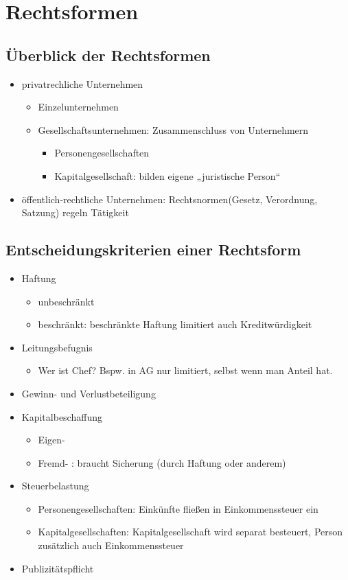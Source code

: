 \documentclass{scrreprt}
\begin{document}
\section{Rechtsformen}
\subsection{Überblick der Rechtsformen}
\begin{itemize}
\item privatrechliche Unternehmen
\begin{itemize}
\item Einzelunternehmen
\item Gesellschaftsunternehmen: Zusammenschluss von Unternehmern
\begin{itemize}
\item Personengesellschaften
\item Kapitalgesellschaft: bilden eigene „juristische Person“
\end{itemize}
\end{itemize}
\item öffentlich-rechtliche Unternehmen: Rechtsnormen(Gesetz, Verordnung, Satzung) regeln Tätigkeit
\end{itemize}
\subsection{Entscheidungskriterien einer Rechtsform}
\begin{itemize}
\item Haftung
\begin{itemize}
\item unbeschränkt
\item beschränkt: beschränkte Haftung limitiert auch Kreditwürdigkeit
\end{itemize}
\item Leitungsbefugnis
\begin{itemize}
\item Wer ist Chef? Bspw. in AG nur limitiert, selbst wenn man Anteil hat.
\end{itemize}
\item Gewinn- und Verlustbeteiligung
\item Kapitalbeschaffung
\begin{itemize}
\item Eigen-
\item Fremd- : braucht Sicherung (durch Haftung oder anderem)
\end{itemize}
\item Steuerbelastung
\begin{itemize}
\item Personengesellschaften: Einkünfte fließen in Einkommenssteuer ein
\item Kapitalgesellschaften: Kapitalgesellschaft wird separat besteuert, Person zusätzlich auch Einkommenssteuer
\end{itemize}
\item Publizitätspflicht
\end{itemize}
\end{document}

